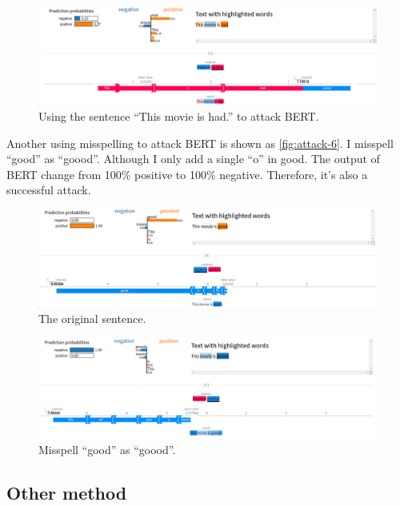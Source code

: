 \documentclass{article}[12pt]
\begin{document}
\begin{figure}[htbp]
	\centering
	\includegraphics[width=\linewidth]{figure/attack-5}
	\caption{Using the sentence ``This movie is had.'' to attack BERT.}
	\label{fig:attack-5}
\end{figure}

Another using misspelling to attack BERT is shown as \autoref{fig:attack-6}. I misspell ``good'' as ``goood''. Although I only add a single ``o'' in good. The output of BERT change from 100\% positive to 100\% negative. Therefore, it's also a successful attack.

\begin{figure}[htbp]
	\centering
	\includegraphics[width=\linewidth]{figure/attack-7}
	\caption{The original sentence.}
	\label{fig:attack-7}
\end{figure}


\begin{figure}[H]
	\centering
	\includegraphics[width=\linewidth]{figure/attack-6}
	\caption{Misspell ``good'' as ``goood''.}
	\label{fig:attack-6}
\end{figure}

\subsection{Other method}
\end{document}
